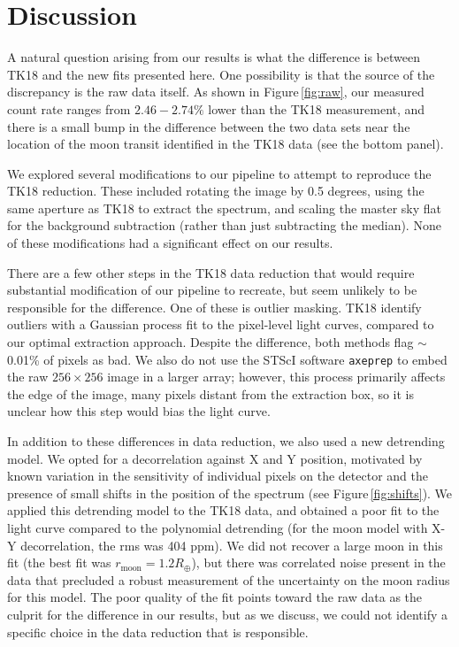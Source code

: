 \documentclass[twocolumn]{aastex62}
\begin{document}
\section{Discussion}
A natural question arising from our results is what the difference is between TK18 and the new fits presented here. One possibility is that the source of the discrepancy is the raw data itself. As shown in Figure\,\ref{fig:raw}, our measured count rate ranges from $2.46 -2.74\%$ lower than the TK18 measurement, and there is a small bump in the difference between the two data sets near the location of the moon transit identified in the TK18 data (see the bottom panel).

 We explored several modifications to our pipeline to attempt to reproduce the TK18 reduction. These included rotating the image by 0.5 degrees, using the same aperture as TK18 to extract the spectrum, and scaling the master sky flat for the background subtraction (rather than just subtracting the median). None of these modifications had a significant effect on our results. 

There are a few other steps in the TK18 data reduction that would require substantial modification of our pipeline to recreate, but seem unlikely to be responsible for the difference. One of these is outlier masking. TK18 identify outliers with a Gaussian process fit to the pixel-level light curves, compared to our optimal extraction approach. Despite the difference, both methods flag $\sim$0.01\% of pixels as bad.  We also do not use the STScI software \texttt{axeprep} to embed the raw $256\times256$ image in a larger array; however, this process primarily affects the edge of the image, many pixels distant from the extraction box, so it is unclear how this step would bias the light curve.
 
 
In addition to these differences in data reduction, we also used a new detrending model. We opted for a decorrelation against X and Y position, motivated by known variation in the sensitivity of individual pixels on the detector and the presence of small shifts in the position of the spectrum (see Figure\,\ref{fig:shifts}). We applied this detrending model to the TK18 data, and obtained a poor fit to the light curve compared to the polynomial detrending (for the moon model with X-Y decorrelation, the rms was 404 ppm). We did not recover a large moon in this fit (the best fit was $r_\mathrm{moon} = 1.2R_\oplus$), but there was correlated noise present in the data that precluded a robust measurement of the uncertainty on the moon radius for this model. The poor quality of the fit points toward the raw data as the culprit for the difference in our results, but as we discuss, we could not identify a specific choice in the data reduction that is responsible.
\end{document}
